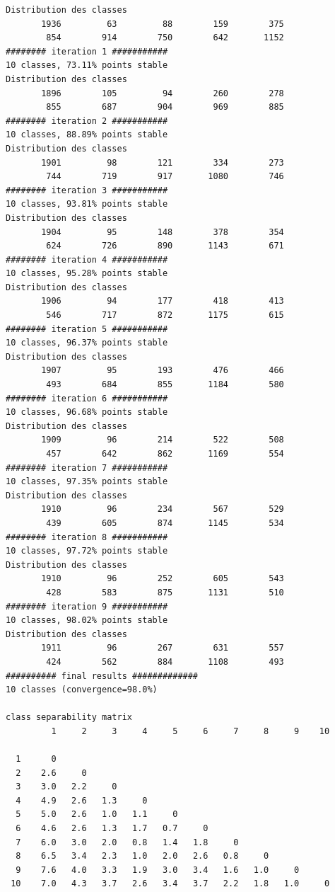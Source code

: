 \documentclass[land,article,submit,pdftex,moreauthors]{Definitions/mdpi}
\begin{document}
\begin{scriptsize}
\begin{verbatim}
Distribution des classes
       1936         63         88        159        375
        854        914        750        642       1152
######## iteration 1 ###########
10 classes, 73.11% points stable
Distribution des classes
       1896        105         94        260        278
        855        687        904        969        885
######## iteration 2 ###########
10 classes, 88.89% points stable
Distribution des classes
       1901         98        121        334        273
        744        719        917       1080        746
######## iteration 3 ###########
10 classes, 93.81% points stable
Distribution des classes
       1904         95        148        378        354
        624        726        890       1143        671
######## iteration 4 ###########
10 classes, 95.28% points stable
Distribution des classes
       1906         94        177        418        413
        546        717        872       1175        615
######## iteration 5 ###########
10 classes, 96.37% points stable
Distribution des classes
       1907         95        193        476        466
        493        684        855       1184        580
######## iteration 6 ###########
10 classes, 96.68% points stable
Distribution des classes
       1909         96        214        522        508
        457        642        862       1169        554
######## iteration 7 ###########
10 classes, 97.35% points stable
Distribution des classes
       1910         96        234        567        529
        439        605        874       1145        534
######## iteration 8 ###########
10 classes, 97.72% points stable
Distribution des classes
       1910         96        252        605        543
        428        583        875       1131        510
######## iteration 9 ###########
10 classes, 98.02% points stable
Distribution des classes
       1911         96        267        631        557
        424        562        884       1108        493
########## final results #############
10 classes (convergence=98.0%)

class separability matrix
         1     2     3     4     5     6     7     8     9    10

  1      0
  2    2.6     0
  3    3.0   2.2     0
  4    4.9   2.6   1.3     0
  5    5.0   2.6   1.0   1.1     0
  6    4.6   2.6   1.3   1.7   0.7     0
  7    6.0   3.0   2.0   0.8   1.4   1.8     0
  8    6.5   3.4   2.3   1.0   2.0   2.6   0.8     0
  9    7.6   4.0   3.3   1.9   3.0   3.4   1.6   1.0     0
 10    7.0   4.3   3.7   2.6   3.4   3.7   2.2   1.8   1.0     0



\end{verbatim}
\end{scriptsize}
\end{document}
